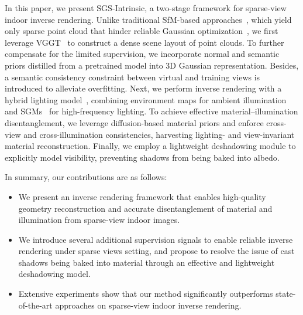 In this paper, we present SGS-Intrinsic, a two-stage framework for sparse-view indoor inverse rendering. Unlike traditional SfM-based approaches~\cite{schonberger2016structure}, which yield only sparse point cloud that hinder reliable Gaussian optimization~\cite{zhu2024fsgs,wu2025sparse2dgs}, we first leverage VGGT~\cite{wang2025vggt} to construct a dense scene layout of point clouds. To further compensate for the limited supervision, we incorporate normal and semantic priors distilled from a pretrained model into 3D Gaussian representation. Besides, a semantic consistency constraint between virtual and training views is introduced to alleviate overfitting. Next, we perform inverse rendering with a hybrid lighting model~\cite{du2024gs}, combining environment maps for ambient illumination and SGMs~\cite{wang2009all} for high-frequency lighting. To achieve effective material–illumination disentanglement, we leverage diffusion-based material priors and enforce cross-view and cross-illumination consistencies, harvesting lighting- and view-invariant material reconstruction. Finally, we employ a lightweight deshadowing module to explicitly model visibility, preventing shadows from being baked into albedo.


In summary, our contributions are as follows:
\begin{itemize}[leftmargin=2em]
\setlength\itemsep{0.5em} 
\item 
We present an inverse rendering framework that enables high-quality geometry reconstruction and accurate disentanglement of material and illumination from sparse-view indoor images. 
\item
We introduce several additional supervision signals to enable reliable inverse rendering under sparse views setting, and propose to resolve the issue of cast shadows being baked into material through an effective and lightweight deshadowing model.
\item
Extensive experiments show that our method significantly outperforms state-of-the-art approaches on sparse-view indoor inverse rendering.
\end{itemize}
